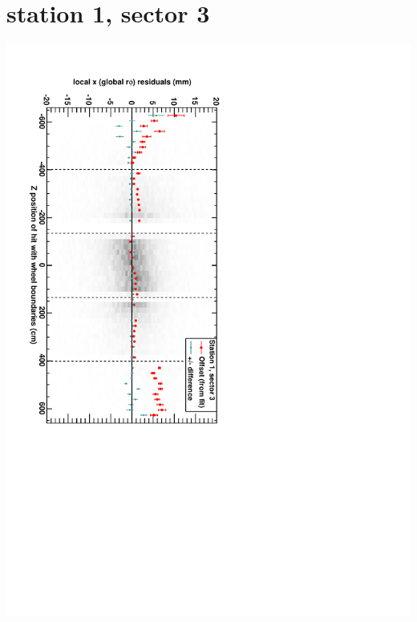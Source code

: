 \documentclass[compress]{beamer}
\begin{document}
\section*{station 1, sector 3}
\begin{frame} \vfill \mbox{\hspace{-1 cm}\includegraphics[height=1.2\linewidth, angle=90]{DTrphiVsZ_st1_sr03.pdf}} \end{frame}
\end{document}

